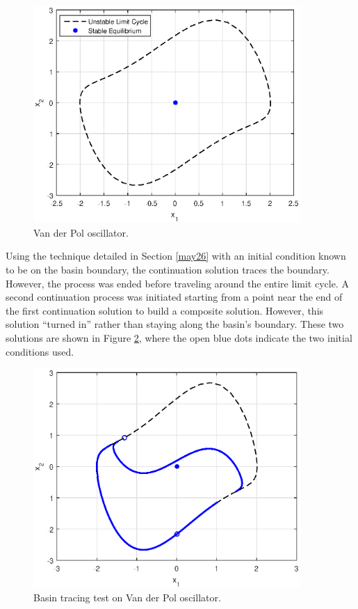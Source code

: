 \documentclass[12pt]{article}
\begin{document}
\begin{figure}[H]
\begin{center}
\includegraphics[width=4in]{VDP.eps}
\caption{Van der Pol oscillator.}
\label{VDP}
\end{center}
\end{figure}

Using the technique detailed in Section \ref{may26} with an initial condition known to be on the basin boundary, the continuation solution traces the boundary. However, the process was ended before traveling around the entire limit cycle. A second continuation process was initiated starting from a point near the end of the first continuation solution to build a composite solution. However, this solution ``turned in'' rather than staying along the basin's boundary. These two solutions are shown in Figure \ref{cbt_vdp01}, where the open blue dots indicate the two initial conditions used.

\begin{figure}[H]
\begin{center}
\includegraphics[width=4in]{cbt_vdp01.eps}
\caption{Basin tracing test on Van der Pol oscillator.}
\label{cbt_vdp01}
\end{center}
\end{figure}
\end{document}
